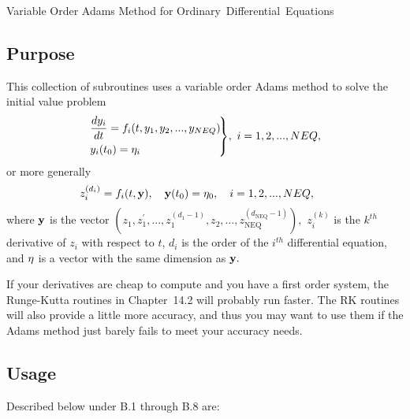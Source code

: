 \documentclass[twoside]{MATH77}
\begin{document}
 Variable Order Adams Method for
\hbox{Ordinary Differential Equations}


\subsection{Purpose}

This collection of subroutines uses a variable order Adams method to
solve the initial value problem
\begin{equation}
\label{O1}\!\!\!\left.
\begin{array}{l}
\displaystyle\frac{dy_i}{dt}=f_i(t,y_1,y_2,...,y_{NEQ})\vspace{4pt} \\
\displaystyle y_i(t_0)=\eta _i
\end{array}
\!\!\!\!\right\} \!,\ i=1,2,...,NEQ,
\end{equation}
or more generally
\begin{equation}\label{O2}
\hspace{-15pt}z_i^{(d_i)}=f_i(t,{\bf y}),\quad {\bf y}(t_0)={\bf \eta }_0,
\quad i=1,2,...,NEQ,
\end{equation}
where ${\bf y}$ is the vector $(z_1,z_1^{\prime
},...,z_1^{(d_1-1)},z_2,...,z_{\text{NEQ}}^{(d_{\text{NEQ}}-1)}),$
$z_i^{(k)}$ is the $k^{th}$ derivative of $z_i$ with respect to $t$, $d_i$ is
the order of the $i^{th}$ differential equation, and ${\bf \eta }$ is a vector
with the same dimension as ${\bf y}.$

If your derivatives are cheap to compute and you have a first order system,
the Runge-Kutta routines in Chapter~14.2 will probably run faster.  The RK
routines will also provide a little more accuracy, and thus you may want to use
them if the Adams method just barely fails to meet your accuracy needs.

\subsection{Usage}

Described below under B.1 through B.8 are:
\end{document}
